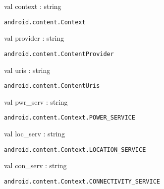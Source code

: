 \documentclass[11pt]{article}
\begin{document}
\begin{ocamldocsigend}


\label{val:Android.Content.context}\begin{ocamldoccode}
val context : string
\end{ocamldoccode}
\begin{ocamldocdescription}
{\tt{android.content.Context}}


\end{ocamldocdescription}


\label{val:Android.Content.provider}\begin{ocamldoccode}
val provider : string
\end{ocamldoccode}
\begin{ocamldocdescription}
{\tt{android.content.ContentProvider}}


\end{ocamldocdescription}


\label{val:Android.Content.uris}\begin{ocamldoccode}
val uris : string
\end{ocamldoccode}
\begin{ocamldocdescription}
{\tt{android.content.ContentUris}}


\end{ocamldocdescription}


\label{val:Android.Content.pwr-underscoreserv}\begin{ocamldoccode}
val pwr_serv : string
\end{ocamldoccode}
\begin{ocamldocdescription}
{\tt{android.content.Context.POWER\_SERVICE}}


\end{ocamldocdescription}


\label{val:Android.Content.loc-underscoreserv}\begin{ocamldoccode}
val loc_serv : string
\end{ocamldoccode}
\begin{ocamldocdescription}
{\tt{android.content.Context.LOCATION\_SERVICE}}


\end{ocamldocdescription}


\label{val:Android.Content.con-underscoreserv}\begin{ocamldoccode}
val con_serv : string
\end{ocamldoccode}
\begin{ocamldocdescription}
{\tt{android.content.Context.CONNECTIVITY\_SERVICE}}



\end{ocamldocdescription}
\end{ocamldocsigend}
\end{document}
